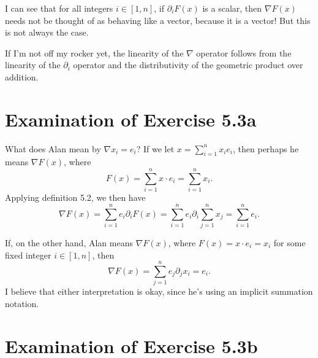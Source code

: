 \documentclass[12pt]{article}
\begin{document}
I can see that for all integers $i\in[1,n]$, if $\partial_i F(x)$ is a scalar,
then $\nabla F(x)$ needs not be thought of as behaving like a vector,
because it is a vector!  But this is not always the case.

If I'm not off my rocker yet, the linearity of the $\nabla$ operator
follows from the linearity of the $\partial_i$ operator and the
distributivity of the geometric product over addition.

\section*{Examination of Exercise 5.3a}

What does Alan mean by $\nabla x_i=e_i$?
If we let $x=\sum_{i=1}^n x_ie_i$, then perhaps he means $\nabla F(x)$, where
\begin{equation*}
F(x) = \sum_{i=1}^n x\cdot e_i = \sum_{i=1}^n x_i.
\end{equation*}
Applying definition 5.2, we then have
\begin{equation*}
\nabla F(x) = \sum_{i=1}^n e_i\partial_i F(x) = \sum_{i=1}^n e_i\partial_i\sum_{j=1}^n x_j = \sum_{i=1}^n e_i.
\end{equation*}

If, on the other hand, Alan means $\nabla F(x)$, where $F(x)=x\cdot e_i=x_i$
for some fixed integer $i\in[1,n]$, then
\begin{equation*}
\nabla F(x) = \sum_{j=1}^n e_j\partial_j x_i = e_i.
\end{equation*}
I believe that either interpretation is okay, since he's using an implicit summation notation.

\section*{Examination of Exercise 5.3b}
\end{document}
